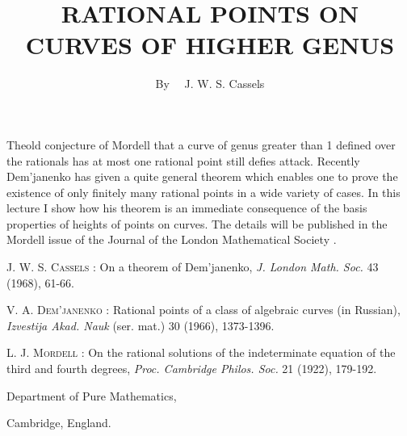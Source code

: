 \title{RATIONAL POINTS ON CURVES OF HIGHER GENUS}

\author{By~~ J. W. S. Cassels}

\date{}

\maketitle

\setcounter{pageoriginal}{82}
The\pageoriginale old conjecture of Mordell \cite{art06-key3} that a curve of genus greater than 1 defined over the rationals has at most one rational point still defies attack. Recently Dem'janenko \cite{art06-key2} has given a quite general theorem which enables one to prove the existence of only finitely many rational points in a wide variety of cases. In this lecture I show how his theorem is an immediate consequence of the basis properties of heights of points on curves. The details will be published in the Mordell issue of the Journal of the London Mathematical Society \cite{art06-key1}.

\begin{thebibliography}{99}
 \textsc{J. W. S. Cassels :} On a theorem of Dem'janenko, {\em J. London Math. Soc.} 43 (1968), 61-66.

 \textsc{V. A. Dem'janenko :} Rational points of a class of algebraic curves (in Russian), {\em Izvestija Akad. Nauk} (ser. mat.) 30 (1966), 1373-1396.

 \textsc{L. J. Mordell :} On the rational solutions of the indeterminate equation of the third and fourth degrees, {\em Proc. Cambridge Philos. Soc.} 21 (1922), 179-192.
\end{thebibliography}

\medskip
\noindent
Department of Pure Mathematics,

\noindent
Cambridge, England.
